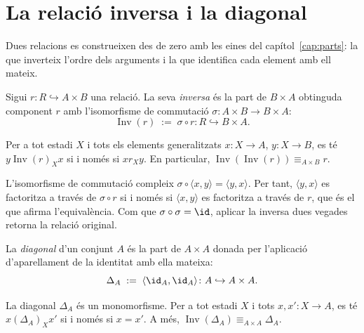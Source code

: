 \section{La relació inversa i la diagonal}\label{sec:inversa-diagonal}

Dues relacions es construeixen des de zero amb les eines del capítol~\ref{cap:parts}: la que inverteix l'ordre dels arguments i la que identifica cada element amb ell mateix.

\begin{definicio}\label{def:relacio-inversa}
Sigui \(r\colon R\hookrightarrow A\times B\) una relació. La seva \emph{inversa} és la part de \(B\times A\) obtinguda component \(r\) amb l'isomorfisme de commutació \(\sigma\colon A\times B\to B\times A\):
\[
\operatorname{Inv}(r)\;:=\;\sigma\circ r\colon R\hookrightarrow B\times A.
\]
\end{definicio}

\begin{proposicio}\label{prop:inversa-pertinenca}
Per a tot estadi \(X\) i tots els elements generalitzats \(x\colon X\to A\), \(y\colon X\to B\), es té \(y\mathrel{\operatorname{Inv}(r)_X}x\) si i només si \(x\mathrel{r_X}y\). En particular, \(\operatorname{Inv}(\operatorname{Inv}(r))\equiv_{A\times B}r\).
\end{proposicio}

\begin{prova}
L'isomorfisme de commutació compleix \(\sigma\circ\langle x,y\rangle=\langle y,x\rangle\). Per tant, \(\langle y,x\rangle\) es factoritza a través de \(\sigma\circ r\) si i només si \(\langle x,y\rangle\) es factoritza a través de \(r\), que és el que afirma l'equivalència. Com que \(\sigma\circ\sigma=\id\), aplicar la inversa dues vegades retorna la relació original.
\end{prova}

\begin{definicio}[Diagonal]\label{def:diagonal}
La \emph{diagonal} d'un conjunt \(A\) és la part de \(A\times A\) donada per l'aplicació d'aparellament de la identitat amb ella mateixa:
\[
\Delta_A\;:=\;\langle\id_A,\id_A\rangle\colon A\hookrightarrow A\times A.
\]
\end{definicio}

\begin{proposicio}\label{prop:diagonal-mono}
La diagonal \(\Delta_A\) és un monomorfisme. Per a tot estadi \(X\) i tots \(x,x'\colon X\to A\), es té \(x\mathrel{(\Delta_A)_X}x'\) si i només si \(x=x'\). A més, \(\operatorname{Inv}(\Delta_A)\equiv_{A\times A}\Delta_A\).
\end{proposicio}

